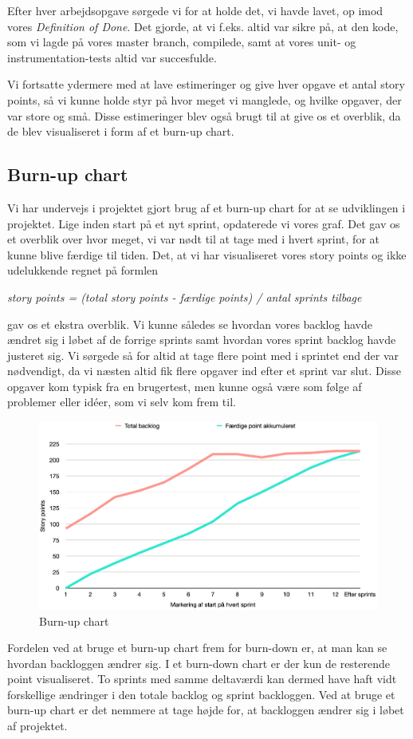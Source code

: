 Efter hver arbejdsopgave sørgede vi for at holde det, vi havde lavet, op imod vores \textit{Definition of Done}. Det gjorde, at vi f.eks. altid var sikre på, at den kode, som vi lagde på vores master branch, compilede, samt at vores unit- og instrumentation-tests altid var succesfulde.

Vi fortsatte ydermere med at lave estimeringer og give hver opgave et antal story points, så vi kunne holde styr på hvor meget vi manglede, og hvilke opgaver, der var store og små. Disse estimeringer blev også brugt til at give os et overblik, da de blev visualiseret i form af et burn-up chart.

\subsection{Burn-up chart}
Vi har undervejs i projektet gjort brug af et burn-up chart for at se udviklingen i projektet. Lige inden start på et nyt sprint, opdaterede vi vores graf. Det gav os et overblik over hvor meget, vi var nødt til at tage med i hvert sprint, for at kunne blive færdige til tiden. Det, at vi har visualiseret vores story points og ikke udelukkende regnet på formlen \medskip

\textit{story points = (total story points - færdige points) / antal sprints tilbage} \smallskip

gav os et ekstra overblik. Vi kunne således se hvordan vores backlog havde ændret sig i løbet af de forrige sprints samt hvordan vores sprint backlog havde justeret sig.  Vi sørgede så for altid at tage flere point med i sprintet end der var nødvendigt, da vi næsten altid fik flere opgaver ind efter et sprint var slut. Disse opgaver kom typisk fra en brugertest, men kunne også være som følge af problemer eller idéer, som vi selv kom frem til.

\begin{figure}[H]
    \centering
    \includegraphics[width=1\textwidth]{img/burn-up-chart.png}
    \caption{Burn-up chart}
    \label{burn-up}
\end{figure}

Fordelen ved at bruge et burn-up chart frem for burn-down er, at man kan se hvordan backloggen ændrer sig. I et burn-down chart er der kun de resterende point visualiseret. To sprints med samme deltaværdi kan dermed have haft vidt forskellige ændringer i den totale backlog og sprint backloggen. Ved at bruge et burn-up chart er det nemmere at tage højde for, at backloggen ændrer sig i løbet af projektet.
